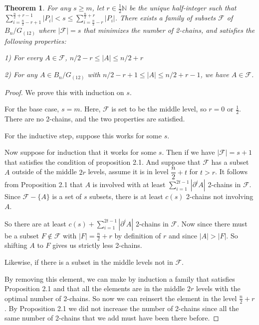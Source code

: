 \documentclass[12pt]{article}
\theoremstyle{plain}
\newtheorem{theorem}{Theorem}
\theoremstyle{definition}
\theoremstyle{remark}
\newcommand{\F}{\mathcal{F}}
\begin{document}
\begin{theorem} For any $s \geq m$, let $r \in \frac{1}{2}\mathbb{N}$ be the unique half-integer such that $\sum_{i = \frac{n}{2} - r +1}^{\frac{n}{2} + r -1} |P_i| < s \leq \sum_{i = \frac{n}{2}-r}^{\frac{n}{2}+r}|P_i|$. There exists a family of subsets $\F$ of $B_n / G_{(12)}$ where $|\F| = s$ that minimizes the number of 2-chains, and satisfies the following properties:

1) For every $A \in \F$, $n/2 - r \leq |A| \leq n/2 + r$

2) For any $A \in B_n / G_{(12)}$ with $n/2 - r + 1 \leq |A| \leq n/2 + r - 1$, we have $A \in \F$.
\end{theorem}

\begin{proof}
We prove this with induction on $s$.

For the base case, $s = m$. Here, $\F$ is set to be the middle level, so $r = 0$ or $\frac{1}{2}$. There are no 2-chains, and the two properties are satisfied.

For the inductive step, suppose this works for some $s$. 

Now suppose for induction that it works for some $s$. Then if we have $|\F| = s + 1$ that satisfies the condition of proposition 2.1. And suppose that $\F$ has a subset $A$ outside of the middle $2r$ levels, assume it is in level $\dfrac{n}{2} + t$ for $t > r$. It follows from Proposition 2.1 that $A$ is involved with at least $\sum_{i=1}^{2t-1} |\partial^i A|$ 2-chains in $\F$. Since $\F - \{A \}$ is a set of $s$ subsets, there is at least $c(s)$ 2-chains not involving $A$. 

So there are at least $c(s) + \sum_{i=1}^{2t-1} |\partial^i A|$ 2-chains in $\F$. Now since there must be a subset $F \notin \F$ with $|F| = \frac{n}{2}+r$ by definition of $r$ and since $|A| > |F|$. So shifting $A$ to $F$ gives us strictly less 2-chains.  

Likewise, if there is a subset in the middle levels not in $\F$.

By removing this element, we can make by induction a family that satisfies Proposition 2.1 and that all the elements are in the middle $2r$ levels with the optimal number of 2-chains. So now we can reinsert the element in the level $\frac{n}{2} + r$. By Proposition 2.1 we did not increase the number of 2-chains since all the same number of 2-chains that we add must have been there before. 
\end{proof}

\end{document}
